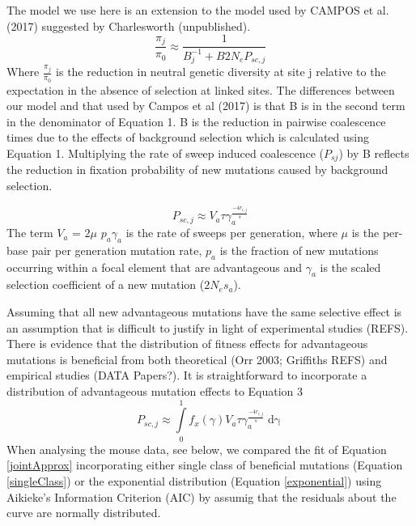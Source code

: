 \documentclass[11pt]{article}
\begin{document}
The model we use here is an extension to the model used by CAMPOS et al. (2017) suggested by Charlesworth (unpublished). 
\begin{equation}
\label{jointApprox}
\frac{\pi_{j}}{\pi_{0}} \approx  \frac{1}{B_{j}^{-1}  + B2N_eP_{sc,j}}
\end{equation}
	Where \(\frac{\pi_{j}}{\pi_{0}}\) is the reduction in neutral genetic diversity at site j relative to the expectation in the absence of selection at linked sites. The differences between our model and that used by Campos et al (2017) is that B is in the second term in the denominator of Equation 1. B is the reduction in pairwise coalescence times due to the effects of background selection which is calculated using Equation 1. Multiplying the rate of sweep induced coalescence ($P_{sj}$) by B reflects the reduction in fixation probability of new mutations caused by background selection. 

\begin{equation}
\label{singleClass}
P_{sc,j} \approx V_a \tau\gamma_a^{\frac{-4r_{i,j}}{s}} 
\end{equation}
The term $V_{a}$ = $2\mu$ $p_{a}\gamma_{a}$ is the rate of sweeps per generation, where $\mu$ is the per-base pair per generation mutation rate, $p_a$ is the fraction of new mutations occurring within a focal element that are advantageous and $\gamma_a$  is the scaled selection coefficient of a new mutation ($2N_es_a$).

	Assuming that all new advantageous mutations have the same selective effect is an assumption that is difficult to justify in light of experimental studies (REFS). There is evidence that the distribution of fitness effects for advantageous mutations is beneficial from both theoretical (Orr 2003; Griffiths REFS) and empirical studies (DATA Papers?). It is straightforward to incorporate a distribution of advantageous mutation effects to Equation 3
		\begin{equation}
		\label{exponential}
P_{sc,j} \approx \int \limits_{0}^{1} f_x(\gamma) V_a \tau\gamma_a^{\frac{-4r_{i,j}}{s}} \mathop{d\gamma}
		\end{equation}
When analysing the mouse data, see below, we compared the fit of Equation \ref{jointApprox} incorporating either single class of beneficial mutations (Equation \ref{singleClass}) or the exponential distribution (Equation \ref{exponential}) using Aikieke's Information Criterion (AIC) by assumig that the residuals about the curve are normally distributed.
\end{document}
